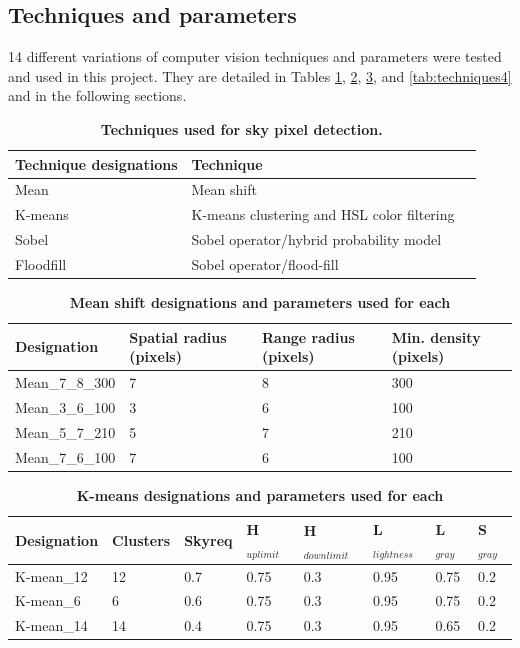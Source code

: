\documentclass[final,3p,times,authoryear]{elsarticle}
\begin{document}
\subsection{Techniques and parameters}
14 different variations of computer vision techniques and parameters were tested and used in this project. They are detailed in Tables \ref{tab:techniques}, \ref{tab:techniques2}, \ref{tab:techniques3}, and \ref{tab:techniques4} and in the following sections.

\begin{table}[!htbp]
\caption{\bf Techniques used for sky pixel detection.  \label{tab:techniques}}     
\begin{tabular}{ l  l l}
\textbf{Technique designations} & \textbf{Technique}  \\ \hline
Mean &  Mean shift \\
K-means  & K-means clustering and HSL color filtering \\
Sobel  & Sobel operator/hybrid probability model \\	
Floodfill  & Sobel operator/flood-fill \\
\hline
\end{tabular}
\end{table}


\begin{table}[!htbp]
\caption{\bf Mean shift designations and parameters used for each \label{tab:techniques2}}     
\begin{tabular}{ l  l  l l}
\textbf{Designation}  & \textbf{Spatial radius (pixels)}&\textbf{Range radius (pixels)}&\textbf{Min. density (pixels)}   \\ \hline
Mean\_7\_8\_300 & 7 & 8& 300 \\
Mean\_3\_6\_100	 & 3& 6& 100 \\
Mean\_5\_7\_210	 & 5& 7& 210 \\	 
Mean\_7\_6\_100	 & 7& 6& 100 \\

\hline
\end{tabular}
\end{table}

\begin{table}[!htbp]
\caption{\bf K-means designations and parameters used for each \label{tab:techniques3}}     
\begin{tabular}{ l l l l l l l l}
\textbf{Designation} & \textbf{Clusters} & \textbf{Skyreq}&\textbf{H$_{uplimit}$}&\textbf{H$_{downlimit}$} & \textbf{L$_{lightness}$} & \textbf{L$_{gray}$}& \textbf{S$_{gray}$} \\ \hline
K-mean\_12  & 12 & 0.7& 0.75& 0.3 & 0.95 & 0.75 & 0.2 \\
K-mean\_6  & 6 & 0.6& 0.75& 0.3 & 0.95 & 0.75 & 0.2 \\
K-mean\_14  & 14 & 0.4& 0.75& 0.3 & 0.95 & 0.65 & 0.2 \\
\hline
\end{tabular}
\end{table}
\end{document}
